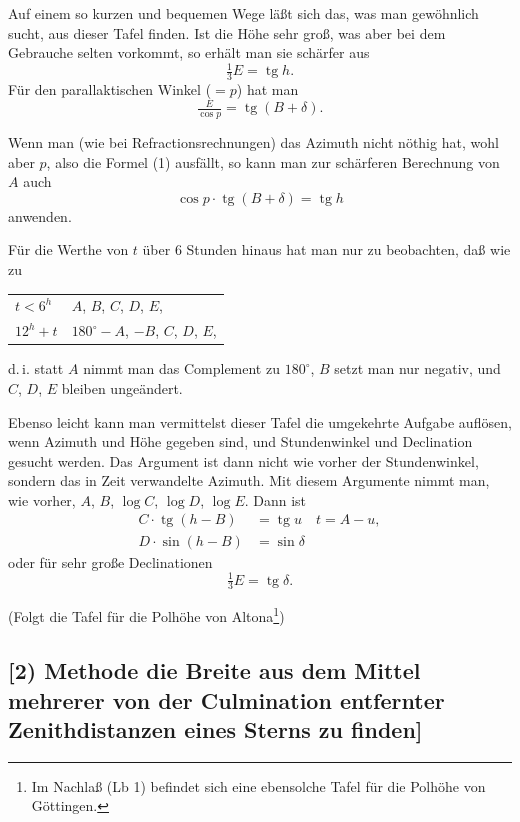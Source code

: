 \documentclass[12pt,a4paper]{article}
\theoremstyle{plain}
\theoremstyle{definition}
\theoremstyle{remark}
\DeclareMathOperator{\tg}{tg}
\begin{document}
Auf einem so kurzen und bequemen Wege l\"a\ss t sich das, was man gew\"ohnlich sucht, aus dieser Tafel finden. Ist die H\"ohe sehr gro\ss, was aber bei dem Gebrauche selten vorkommt, so erh\"alt man sie sch\"arfer aus
\begin{equation}
\tfrac{1}{3}E = \tg h.
\end{equation}
F\"ur den parallaktischen Winkel ($=p$) hat man
\begin{equation}
\tfrac{E}{\cos p} = \tg(B+\delta).
\end{equation}

Wenn man (wie bei Refractionsrechnungen) das Azimuth nicht n\"othig hat, wohl aber $p$, also die Formel (1) ausf\"allt, so kann man zur sch\"arferen Berechnung von $A$ auch
\begin{equation}
\cos p \cdot \tg(B+\delta) = \tg h
\end{equation}
anwenden.

F\"ur die Werthe von $t$ \"uber 6 Stunden hinaus hat man nur zu beobachten, da\ss{} wie zu
\begin{center}
\begin{tabular}{l@{ geh\"oren: }l}
$t < 6^h$ & $A$, $B$, $C$, $D$, $E$, \\
$12^h + t$ & $180^{\circ} - A$, $-B$, $C$, $D$, $E$,
\end{tabular}
\end{center}
d.\,i. statt $A$ nimmt man das Complement zu $180^{\circ}$, $B$ setzt man nur negativ, und $C$, $D$, $E$ bleiben unge\"andert.

Ebenso leicht kann man vermittelst dieser Tafel die umgekehrte Aufgabe aufl\"osen, wenn Azimuth und H\"ohe gegeben sind, und Stundenwinkel und Declination gesucht werden. Das Argument ist dann nicht wie vorher der Stundenwinkel, sondern das in Zeit verwandelte Azimuth. Mit diesem Argumente nimmt man, wie vorher, $A$, $B$, $\log C$, $\log D$, $\log E$. Dann ist
\begin{align}
C \cdot \tg(h-B) &= \tg u \quad t = A - u, \\
D \cdot \sin(h-B) &= \sin\delta
\end{align}
oder f\"ur sehr gro\ss e Declinationen
\[
\tfrac{1}{3}E = \tg\delta.
\]

(Folgt die Tafel f\"ur die Polh\"ohe von Altona\footnote{Im Nachla\ss{} (Lb 1) befindet sich eine ebensolche Tafel f\"ur die Polh\"ohe von G\"ottingen.})

\newpage

\subsection*{[2) Methode die Breite aus dem Mittel mehrerer von der Culmination entfernter Zenithdistanzen eines Sterns zu finden]}
\end{document}
